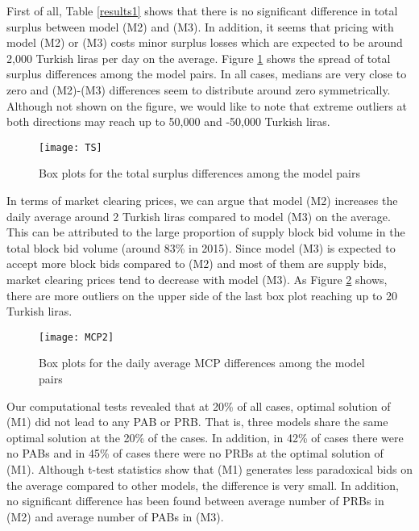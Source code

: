 \documentclass[conference]{IEEEtran}
\begin{document}
First of all, Table \ref{results1} shows that there is no significant difference in total surplus between model (M2) and (M3). In addition, it seems that pricing with model (M2) or (M3) costs minor surplus losses which are expected to be around 2,000 Turkish liras per day on the average. Figure \ref{f1} shows the spread of total surplus differences among the model pairs. In all cases, medians are very close to zero and (M2)-(M3) differences seem to distribute around zero symmetrically. Although not shown on the figure, we would like to note that extreme outliers at both directions may reach up to 50,000 and -50,000 Turkish liras.

\begin{figure}[ht!]
\begin{center}
\texttt{[image: TS]}
\caption{Box plots for the total surplus differences among the model pairs} 
\label{f1}
\end{center}
\end{figure}

In terms of market clearing prices, we can argue that model (M2) increases the daily average around 2 Turkish liras compared to model (M3) on the average. This can be attributed to the large proportion of supply block bid volume in the total block bid volume (around 83\% in 2015). Since model (M3) is expected to accept more block bids compared to (M2) and most of them are supply bids, market clearing prices tend to decrease with model (M3). As Figure \ref{f2} shows, there are more outliers on the upper side of the last box plot reaching up to 20 Turkish liras. 

\begin{figure}[ht!]
\begin{center}
\texttt{[image: MCP2]}
\caption{Box plots for the daily average MCP differences among the model pairs} 
\label{f2}
\end{center}
\end{figure}

Our computational tests revealed that at 20\% of all cases, optimal solution of (M1) did not lead to any PAB or PRB. That is, three models share the same optimal solution at the 20\% of the cases. In addition, in 42\% of cases there were no PABs and in 45\% of cases there were no PRBs at the optimal solution of (M1). Although t-test statistics show that (M1) generates less paradoxical bids on the average compared to other models, the difference is very small. In addition, no significant difference has been found between average number of PRBs in (M2) and average number of PABs in (M3).
\end{document}
